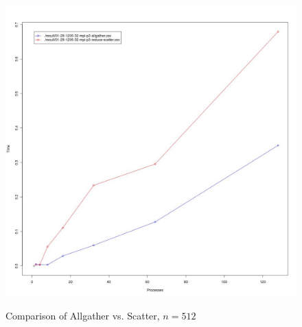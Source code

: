 \documentclass[12pt]{article}
\begin{document}
\begin{figure}
\centering
\caption{Comparison of Allgather vs. Scatter, $n=512$}
\includegraphics[scale=0.3]{candidate-graphs/mpi_p3_512.jpg}
\label{mpi_p3_512}
\end{figure}
\end{document}
